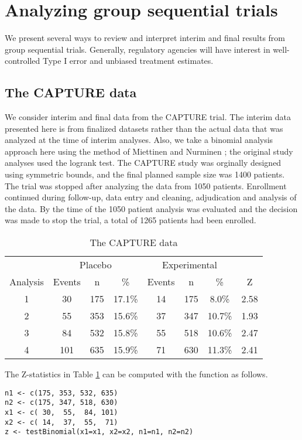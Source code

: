 \section{Analyzing group sequential trials\label{sec:Analysis}}
We present several ways to review and interpret interim and final results from group sequential trials. 
Generally, regulatory agencies will have interest in well-controlled Type I error and unbiased treatment estimates.
\subsection{The CAPTURE data}
We consider interim \cite{EAST} and final \cite{CAPTURE} data from the CAPTURE trial.
The interim data presented here is from finalized datasets rather than the actual data that was analyzed at the time of interim analyses.
Also, we take a binomial analysis approach here using the method of Miettinen and Nurminen \cite{MandN}; the original study analyses used the logrank test. 
The CAPTURE study was orginally designed using symmetric bounds, and the final planned sample size was 1400 patients.
The trial was stopped after analyzing the data from 1050 patients.
Enrollment continued during follow-up, data entry and cleaning, adjudication and analysis of the data.
By the time of the 1050 patient analysis was evaluated and the decision was made to stop the trial, a total of 1265 patients had been enrolled.
\bigskip 
\begin{table}
\begin{center}
\caption{The CAPTURE data\label{CAPTUREdata}}
\begin{tabular}
[c]{cccccccc}\hline
   &\multicolumn{3}{c}{Placebo}&\multicolumn{3}{c}{Experimental}\\
Analysis    &Events&n&\% &Events &n&\% &Z \\ \hline
1   &30	&175	&17.1\%	&14	&175	&8.0\% &2.58 \\
2   &55	&353	&15.6\%	&37	&347	&10.7\%&1.93\\
3   &84	&532	&15.8\%	&55	&518	&10.6\%&2.47 \\
4   &101	&635	&15.9\%	&71	&630	&11.3\%&2.41 \\ \hline
\end{tabular}
\end{center}
\end{table}
\bigskip

The Z-statistics in Table \ref{CAPTUREdata} can be computed with the  function as follows.

\begin{verbatim}
n1 <- c(175, 353, 532, 635)
n2 <- c(175, 347, 518, 630)
x1 <- c( 30,  55,  84, 101)
x2 <- c( 14,  37,  55,  71)
z <- testBinomial(x1=x1, x2=x2, n1=n1, n2=n2)

\end{verbatim}

